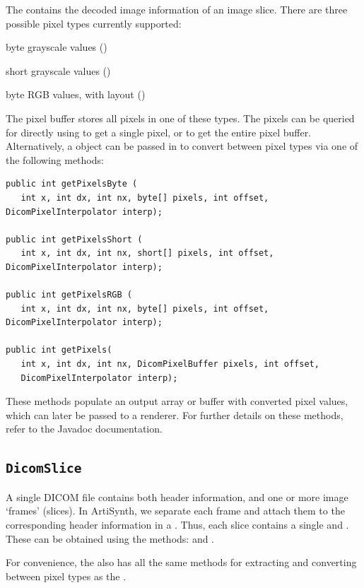 The  contains the decoded image information of an image slice.
There are three possible pixel types currently supported:
\begin{tightemize}
   \item byte grayscale values ()
   \item short grayscale values ()
   \item byte RGB values, with layout  ()
\end{tightemize}
The pixel buffer stores all pixels in one of these types.  The pixels can be queried for directly
using  to get a single pixel, or  to get the
entire pixel buffer.  Alternatively, a  object
can be passed in to convert between pixel types via one of the following methods:
\begin{lstlisting}[]
public int getPixelsByte (
   int x, int dx, int nx, byte[] pixels, int offset, DicomPixelInterpolator interp);

public int getPixelsShort (
   int x, int dx, int nx, short[] pixels, int offset, DicomPixelInterpolator interp);

public int getPixelsRGB (
   int x, int dx, int nx, byte[] pixels, int offset, DicomPixelInterpolator interp);

public int getPixels(
   int x, int dx, int nx, DicomPixelBuffer pixels, int offset, 
   DicomPixelInterpolator interp);
\end{lstlisting}
These methods populate an output array or buffer with converted pixel values, which can later
be passed to a renderer.  For further details on these methods, refer to the Javadoc documentation.

\subsection{\texttt{DicomSlice}}

A single DICOM file contains both header information, and one or more image `frames' (slices).  In
ArtiSynth, we separate each frame and attach them to the corresponding header information in
a .  Thus, each slice contains a single  and 
.  These can be obtained using the methods:  and
.  

For convenience, the  also has all the same methods 
for extracting and converting between pixel types as the .

